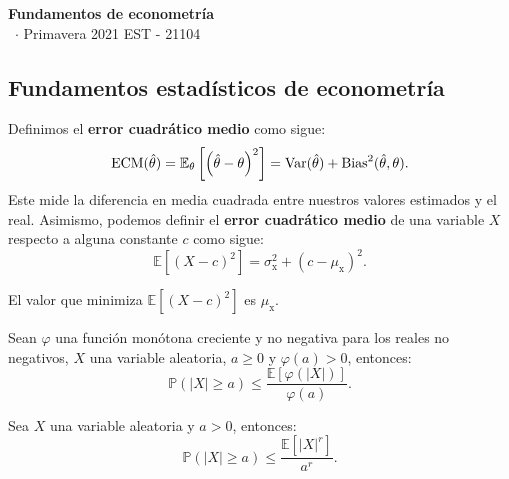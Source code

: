 \documentclass[8pt,a4paper]{extarticle}
\renewcommand{\csClass}{Fundamentos de econometría}
\renewcommand{\csClassCode}{EST - 21104}
\renewcommand{\csTerm}{Primavera 2021}
\begin{document}
\begin{titlepage}
	\begin{center}
		\vspace*{1cm}
		\Huge
		\textbf{\csClass}
		\vspace{0.5cm} \\
		\Large
		\cs\ $\cdot$ \csTerm
		\vfill
		\csAuthorName
		\vspace{0.8cm}
		\csClassCode\\
		\csSchool
	\end{center}
\end{titlepage}

\begin{multicols}{3}
	\setcounter{page}{1}

	\section{Fundamentos estadísticos de econometría}

	\begin{boxdef}
		Definimos el \textbf{error cuadrático medio} como sigue:
		\[
			\text{\normalfont ECM} (\hat{\theta}) = \mathbb{E}_{\theta} \left[ \left( \hat{\theta} - \theta \right)^2  \right]  = \text{\normalfont Var} (\hat{\theta}) + \text{\normalfont Bias}^{2} (\hat{\theta}, \theta)
			.\]
		Este mide la diferencia en media cuadrada entre nuestros valores estimados y el real. Asimismo, podemos definir el \textbf{error cuadrático medio} de una variable $X$ respecto a alguna constante $c$ como sigue:
		\[
			\mathbb{E} \left[ (X - c)^2 \right] = \sigma^2_{\mathrm{x}} + (c - \mu_\mathrm{x})^2
			.\]
	\end{boxdef}

	\begin{boxtheo}
		El valor que minimiza $\mathbb{E}\left[(X-c)^2\right]$ es $\mu_{\mathrm{x}}$.
	\end{boxtheo}

	\begin{boxcor}
		Sean $\varphi$ una función monótona creciente y no negativa para los reales no negativos, $X$ una variable aleatoria, $a \ge 0$ y $\varphi(a) > 0$, entonces:
		\[
			\mathbb{P}\left( \left| X \right| \ge a \right) \le \frac{\mathbb{E}\left[ \varphi \left( \left| X \right|  \right)  \right] }{\varphi(a)}
			.\]
	\end{boxcor}

	\begin{boxcor}
		Sea $X$ una variable aleatoria y $a > 0$, entonces:
		\[
			\mathbb{P}\left( \left| X \right| \ge a  \right) \le \frac{\mathbb{E}\left[ \left| X \right|^r  \right] }{a^r}
			.\]
	\end{boxcor}


\end{multicols}
\end{document}
